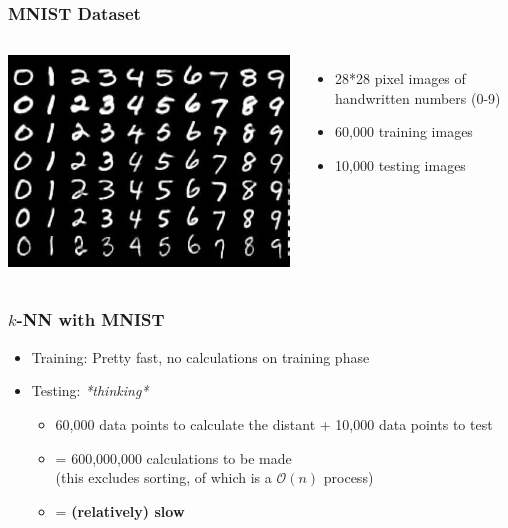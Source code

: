 \documentclass[aspectratio=169]{beamer}
\begin{document}
\begin{frame}
	\frametitle{MNIST Dataset}
	\begin{columns}
		\includegraphics[width=1.0\textwidth]{imgs/mnist.jpeg}
		\begin{itemize}
			\item<2-> 28*28 pixel images of handwritten numbers (0-9)
			\item<3-> 60,000 training images
			\item<4-> 10,000 testing images
		\end{itemize}
	\end{columns}
\end{frame}

\begin{frame}
	\frametitle{$k$-NN with MNIST}
	\begin{itemize}
		\item Training: Pretty fast, no calculations on training phase
		\item Testing: \textit{*thinking*}
		\begin{itemize}
			\item 60,000 data points to calculate the distant + 10,000 data points to test
			\item = 600,000,000 calculations to be made\\
			(this excludes sorting, of which is a $\mathcal{O}(n)$ process)
			\item = \textbf{(relatively) slow}
		\end{itemize}
	\end{itemize}
\end{frame}
\end{document}

